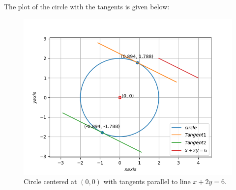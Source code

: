 The plot of the circle with the tangents is given below:
\begin{figure}[h]
\centering
    \includegraphics[width=\columnwidth]{solutions/18/3/Latex/Figure_1.png}
    \caption{Circle centered at $(0, 0)$ with tangents parallel to line $x+2y=6$.}
    \label{eq:solutions/18/3/Latex/fig:1}
\end{figure}
